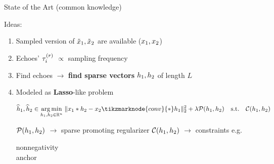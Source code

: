 \begin{frame}{State of the Art {\hfill\small (common knowledge)}\faBook}
    \vfill
    \begin{block}{Ideas:}
    \begin{enumerate}
        \small
        \item[\faCreativeCommonsSamplingPlus] Sampled version of $\tilde{x}_1,\tilde{x}_2$ are available ($x_1, x_2$)
        \item Echoes' $\tau_i^{(r)}$ $\propto$ sampling frequency
        \item Find echoes $\rightarrow$ \textbf{find sparse vectors} $h_1, h_2$ of length $L$
        \item Modeled as \textbf{Lasso}-like problem

        \vspace*{.25em}
        \begin{mysotablock}
            \begin{equation*}
                \widehat{\discRIR}_1, \widehat{\discRIR}_2 \in
                \underset{\discRIR_1, \discRIR_2\in\kR^n}{\arg\min}\;
                \Vert \discMic_1 \contConv \discRIR_2 - \discMic_2 \tikzmarknode{conv}{\contConv} \discRIR_1 \Vert_2^2
                + \lambda \mathcal{P}(\discRIR_1, \discRIR_2)
                \quad\text{s.t.}\quad\mathcal{C}(\discRIR_1, \discRIR_2)
            \end{equation*}

            \vspace*{-2mm}
            \begin{center}
                \footnotesize
                $\mathcal{P}(h_1, h_2)$ $\longrightarrow$ sparse promoting regularizer
                \hspace{5mm} \footnotesize $\mathcal{C}(h_1, h_2)$ $\longrightarrow$ constraints e.g. \parbox{6em}{nonnegativity\\anchor}
            \end{center}
        \end{mysotablock}

    \end{enumerate}
    \end{block}

    \begin{center}
        \footnotesize
        \textcolor{mygreen}{\cmark}  \cite{tong1994blind} \qquad \textcolor{mygreen}{\cmark}  \cite{lin2008blind} \qquad \textcolor{mygreen}{\cmark} \cite{aissa2008blind} \\
        \textcolor{mygreen}{\cmark} \cite{kowalczyk2013blind} \qquad \textcolor{mygreen}{\cmark} \cite{crocco2015room,crocco2016estimation}
    \end{center}

 \end{frame}


